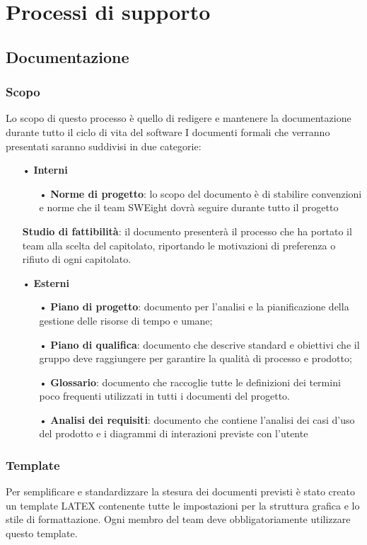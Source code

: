 \section{Processi di supporto}

\subsection{Documentazione}

\subsubsection{Scopo}
Lo scopo di questo processo è quello di redigere e mantenere la documentazione durante tutto il ciclo di vita del software
I documenti formali che verranno presentati saranno suddivisi in due categorie:

\begin{itemize}
\item[•] \textbf{Interni}
	\begin{itemize}
		\item[•] \textbf{Norme di progetto}: lo scopo del documento è di stabilire convenzioni e norme che il team SWEight dovrà seguire durante tutto il progetto
	\end{itemize} \textbf{Studio di fattibilità}: il documento presenterà il processo che ha portato il team alla scelta del capitolato, riportando le motivazioni di preferenza o rifiuto di ogni capitolato.
\item[•] \textbf{Esterni}
	\begin{itemize}
		\item[•] \textbf{Piano di progetto}: documento per l’analisi e la pianificazione della gestione delle risorse di tempo e umane;
		\item[•] \textbf{Piano di qualifica}: documento che descrive standard e obiettivi che il gruppo deve raggiungere per garantire la qualità di processo e prodotto;
		\item[•] \textbf{Glossario}: documento che raccoglie tutte le definizioni dei termini poco frequenti utilizzati in tutti i documenti del progetto.
		\item[•] \textbf{Analisi dei requisiti}: documento che contiene l’analisi dei casi d’uso del prodotto e i diagrammi di interazioni previste con l’utente
	\end{itemize}
\end{itemize}

\subsubsection{Template}
Per semplificare e standardizzare la stesura dei documenti previsti è stato creato un template LATEX contenente tutte le impostazioni per la struttura grafica e lo stile di formattazione. Ogni membro del team deve obbligatoriamente utilizzare questo template.
